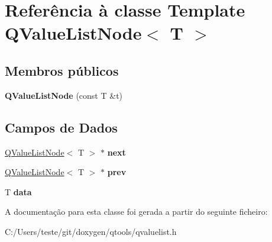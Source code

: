 \hypertarget{class_q_value_list_node}{\section{Referência à classe Template Q\-Value\-List\-Node$<$ T $>$}
\label{class_q_value_list_node}
}
\subsection*{Membros públicos}
\begin{DoxyCompactItemize}
\item 
\hypertarget{class_q_value_list_node_a4a440910a5474f8182497ecc98f5a7a6}{{\bfseries Q\-Value\-List\-Node} (const T \&t)}\label{class_q_value_list_node_a4a440910a5474f8182497ecc98f5a7a6}

\end{DoxyCompactItemize}
\subsection*{Campos de Dados}
\begin{DoxyCompactItemize}
\item 
\hypertarget{class_q_value_list_node_a3ccfbdd4a5d2d5ef3624d154fc306207}{\hyperlink{class_q_value_list_node}{Q\-Value\-List\-Node}$<$ T $>$ $\ast$ {\bfseries next}}\label{class_q_value_list_node_a3ccfbdd4a5d2d5ef3624d154fc306207}

\item 
\hypertarget{class_q_value_list_node_a54bf936cd3fb098d86616d69de9b85c9}{\hyperlink{class_q_value_list_node}{Q\-Value\-List\-Node}$<$ T $>$ $\ast$ {\bfseries prev}}\label{class_q_value_list_node_a54bf936cd3fb098d86616d69de9b85c9}

\item 
\hypertarget{class_q_value_list_node_aa3ff051a47d9e18487e7b819852521c5}{T {\bfseries data}}\label{class_q_value_list_node_aa3ff051a47d9e18487e7b819852521c5}

\end{DoxyCompactItemize}


A documentação para esta classe foi gerada a partir do seguinte ficheiro\-:\begin{DoxyCompactItemize}
\item 
C\-:/\-Users/teste/git/doxygen/qtools/qvaluelist.\-h\end{DoxyCompactItemize}
